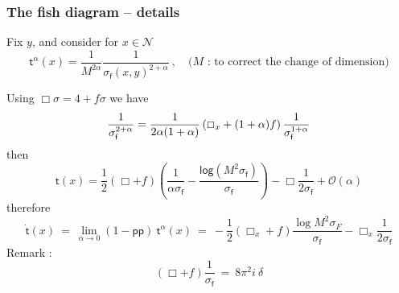 \documentclass[9pt]{beamer}
\newcommand{\logar}{\mathsf{log}} %
\newcommand{\pp}{\mathsf{pp}} %
\newcommand{\Ncal}{\mathcal{N}}
\newcommand{\Ocal}{\mathcal{O}}
\newcommand{\fsf}{\mathsf{f}}
\newcommand{\tsf}{\mathsf{t}}
\begin{document}
\begin{frame}

\frametitle{The fish diagram -- details}
 
Fix $y$, and consider for $x \in \Ncal$
\begin{equation*}
\tsf^\alpha(x) = \frac{1}{M^{2\alpha}} \frac{1}{\sigma_\fsf(x,y)^{2+\alpha}} \ , \quad \mbox{($M$ : to correct the change of dimension)}
\end{equation*}

Using $\Box \sigma = 4 + f \sigma$ we have
%
\begin{equation*}
\frac{1}{\sigma_\fsf^{2+\alpha}}=\frac{1}{2\alpha(1+\alpha)}\left(\Box_x+(1+\alpha)f\right)\frac{1}{\sigma_\fsf^{1+\alpha}} 
\vspace*{-6pt}
\end{equation*}
%
then
%
\begin{equation*}
 \tsf(x) = \frac{1}{2} (\Box + f) \left( \frac{1}{\alpha \sigma_\fsf} - \frac{\logar(M^2\sigma_\fsf)}{\sigma_\fsf} \right) - \Box\frac{1}{2\sigma_\fsf}  + \Ocal(\alpha)
\end{equation*}
%
therefore
%
\vspace*{-6pt}
%
\begin{equation*}
\dot{\tsf}(x) \ = \ \lim_{\alpha\to 0}\left(1-\pp\right) \ \tsf^\alpha(x) \ = \ - \frac{1}{2}(\Box_x+f)\frac{\log M^2 \sigma_F}{\sigma_\fsf}-\Box_x \frac{1}{2\sigma_\fsf} 
\end{equation*}
%
Remark :
%
\vspace*{-8pt}
%
\begin{equation*}
\left( \Box + f \right) \frac{1}{\sigma_\fsf} \ = \ 8 \pi^2 i \ \delta
\end{equation*}

\end{frame}

\end{document}
